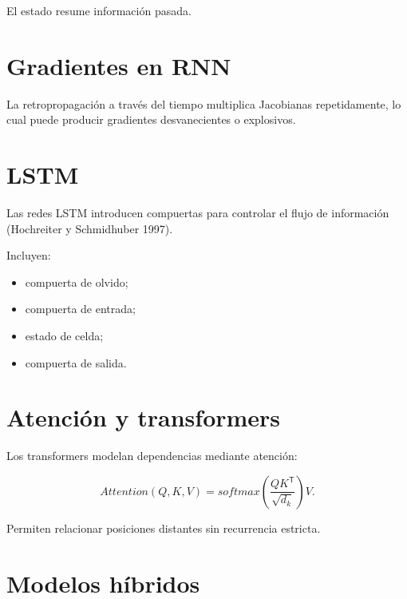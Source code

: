 \documentclass[
  spanish,
  10.5pt,
  letterpaper,
  DIV=11,
  numbers=noendperiod,
  oneside,
  open=any]{scrreprt}
\providecommand{\tightlist}{%
  \setlength{\itemsep}{0pt}\setlength{\parskip}{0pt}}
\theoremstyle{definition}
\theoremstyle{definition}
\theoremstyle{plain}
\theoremstyle{remark}
\begin{document}
El estado resume información pasada.

\section*{Gradientes en RNN}\label{gradientes-en-rnn}


La retropropagación a través del tiempo multiplica Jacobianas
repetidamente, lo cual puede producir gradientes desvanecientes o
explosivos.

\section*{LSTM}\label{lstm}


Las redes LSTM introducen compuertas para controlar el flujo de
información (Hochreiter y Schmidhuber 1997).

Incluyen:

\begin{itemize}
\tightlist
\item
  compuerta de olvido;
\item
  compuerta de entrada;
\item
  estado de celda;
\item
  compuerta de salida.
\end{itemize}

\section*{Atención y transformers}\label{atenciuxf3n-y-transformers}


Los transformers modelan dependencias mediante atención:

\[
Attention(Q,K,V)
=
softmax
\left(
\frac{QK^{\mathsf T}}{\sqrt{d_k}}
\right)V.
\]

Permiten relacionar posiciones distantes sin recurrencia estricta.

\section*{Modelos híbridos}\label{modelos-huxedbridos}
\end{document}
